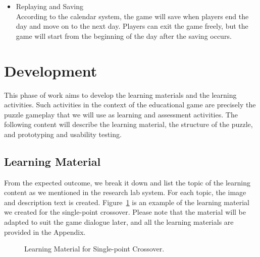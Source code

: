 \documentclass[12pt,oneside,openright,a4paper]{cpe-english-project}
\begin{document}
\begin{itemize}
\item Replaying and Saving \\
According to the calendar system, the game will save when players end the day and move on to the next day. Players can exit the game freely, but the game will start from the beginning of the day after the saving occurs.
\end{itemize}


\section{Development}
This phase of work aims to develop the learning materials and the learning activities. Such activities in the context of the educational game are precisely the puzzle gameplay that we will use as learning and assessment activities. The following content will describe the learning material, the structure of the puzzle, and prototyping and usability testing.

\subsection{Learning Material}
From the expected outcome, we break it down and list the topic of the learning content as we mentioned in the research lab system. For each topic, the image and description text is created. Figure~\ref{fig:develop-learning-material-SPC} is an example of the learning material we created for the single-point crossover. Please note that the material will be adapted to suit the game dialogue later, and all the learning materials are provided in the Appendix. %

\begin{figure}[!h]\centering
{}
\caption{Learning Material for Single-point Crossover.}
\label{fig:develop-learning-material-SPC}
\end{figure}
\end{document}
